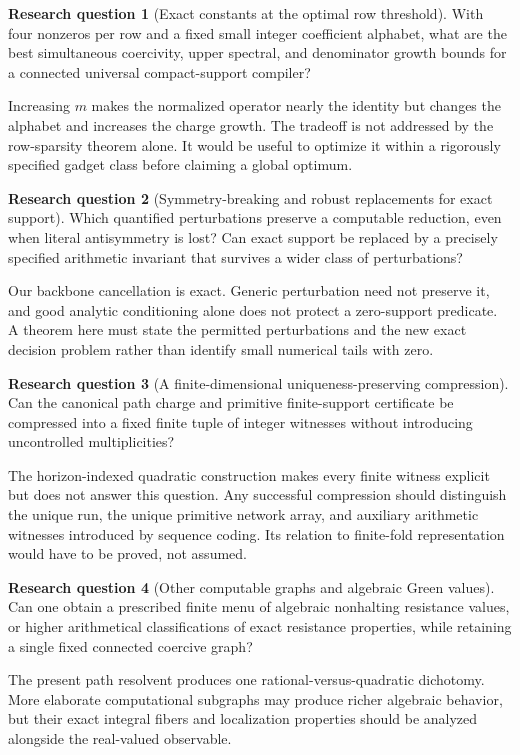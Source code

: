 \documentclass[11pt,letterpaper]{article}
\theoremstyle{definition}
\newtheorem{question}{Research question}
\theoremstyle{remark}
\begin{document}
\begin{question}[Exact constants at the optimal row threshold]\label{ste:wc:q:constants}
With four nonzeros per row and a fixed small integer coefficient alphabet,
what are the best simultaneous coercivity, upper spectral, and denominator
growth bounds for a connected universal compact-support compiler?
\end{question}
Increasing $m$ makes the normalized operator nearly the identity but changes
the alphabet and increases the charge growth. The tradeoff is not addressed
by the row-sparsity theorem alone. It would be useful to optimize it within
a rigorously specified gadget class before claiming a global optimum.

\begin{question}[Symmetry-breaking and robust replacements for exact support]\label{ste:wc:q:robust}
Which quantified perturbations preserve a computable reduction, even when
literal antisymmetry is lost? Can exact support be replaced by a precisely
specified arithmetic invariant that survives a wider class of perturbations?
\end{question}
Our backbone cancellation is exact. Generic perturbation need not preserve
it, and good analytic conditioning alone does not protect a zero-support
predicate. A theorem here must state the permitted perturbations and the
new exact decision problem rather than identify small numerical tails with
zero.

\begin{question}[A finite-dimensional uniqueness-preserving compression]\label{ste:wc:q:compression}
Can the canonical path charge and primitive finite-support certificate be
compressed into a fixed finite tuple of integer witnesses without introducing
uncontrolled multiplicities?
\end{question}
The horizon-indexed quadratic construction makes every finite witness
explicit but does not answer this question. Any successful compression
should distinguish the unique run, the unique primitive network array,
and auxiliary arithmetic witnesses introduced by sequence coding. Its
relation to finite-fold representation would have to be proved, not assumed.

\begin{question}[Other computable graphs and algebraic Green values]\label{ste:wc:q:algebraic}
Can one obtain a prescribed finite menu of algebraic nonhalting resistance
values, or higher arithmetical classifications of exact resistance properties,
while retaining a single fixed connected coercive graph?
\end{question}
The present path resolvent produces one rational-versus-quadratic dichotomy.
More elaborate computational subgraphs may produce richer algebraic behavior,
but their exact integral fibers and localization properties should be
analyzed alongside the real-valued observable.
\end{document}
